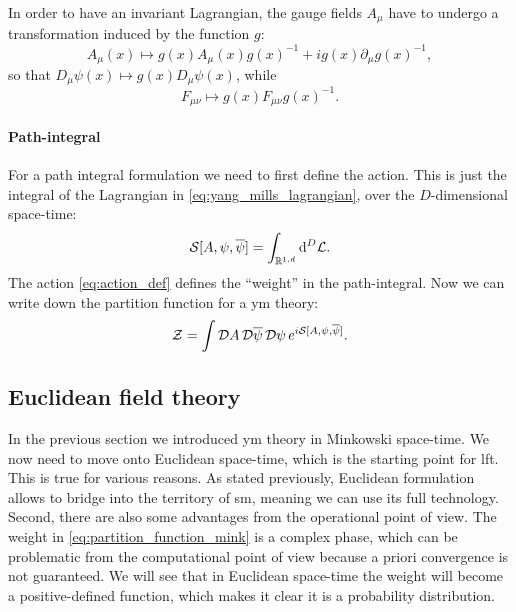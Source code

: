In order to have an invariant Lagrangian, the gauge fields $A_{\mu}$ have to undergo a transformation induced by the function $g$:
\begin{equation}
    A_{\mu}(x) \mapsto g(x) A_{\mu}(x) g(x)^{-1} + i g(x) \partial_{\mu} g(x)^{-1},
\end{equation}
so that $D_{\mu} \psi(x) \mapsto g(x) D_{\mu} \psi(x)$, while
\begin{equation}
    F_{\mu \nu} \mapsto g(x) F_{\mu \nu} g(x)^{-1}.
\end{equation}


\paragraph*{Path-integral}

For a path integral formulation we need to first define the action.
This is just the integral of the Lagrangian in \eqref{eq:yang_mills_lagrangian}, over the $D$-dimensional space-time:
\begin{equation}
    \mathcal{S}[A, \psi, \overline{\psi}] = \int_{\mathbb{R}^{1,d}}  \dd^{D} \mathcal{L}.
    \label{eq:action_def}
\end{equation}
The action \eqref{eq:action_def} defines the ``weight'' in the path-integral.
Now we can write down the partition function for a \ac{ym} theory:
\begin{equation}
    \mathcal{Z} = \int \mathcal{D} A\, \mathcal{D} \overline{\psi}\, \mathcal{D} \psi \, e^{i \mathcal{S}[A, \psi, \overline{\psi}]}.
    \label{eq:partition_function_mink}
\end{equation}


\subsection{Euclidean field theory}
\label{sub:euclidean_field_theory}

In the previous section we introduced \ac{ym} theory in Minkowski space-time.
We now need to move onto Euclidean space-time, which is the starting point for \ac{lft}.
This is true for various reasons.
As stated previously, Euclidean formulation allows to bridge into the territory of \ac{sm}, meaning we can use its full technology.
Second, there are also some advantages from the operational point of view.
The weight in \eqref{eq:partition_function_mink} is a complex phase, which can be problematic from the computational point of view because a priori convergence is not guaranteed.
We will see that in Euclidean space-time the weight will become a positive-defined function, which makes it clear it is a probability distribution.

